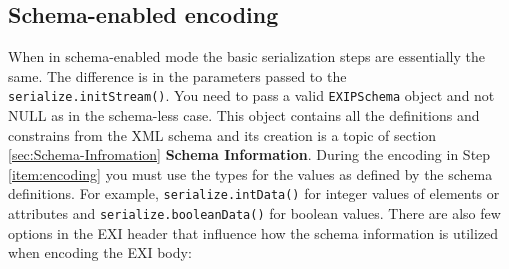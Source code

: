 \subsection{Schema-enabled encoding}
When in schema-enabled mode the basic serialization steps are essentially the same.
The difference is in the parameters passed to the \texttt{serialize.initStream()}.
You need to pass a valid \texttt{EXIPSchema} object and not NULL as in the schema-less
case. This object contains all the definitions and constrains from the XML schema and
its creation is a topic of section \ref{sec:Schema-Infromation} \textbf{Schema Information}.
During the encoding in Step \ref{item:encoding} you must use the types for the
values as defined by the schema definitions. For example, \texttt{serialize.intData()} for
integer values of elements or attributes and \texttt{serialize.booleanData()} for boolean values.
There are also few options
in the EXI header that influence how the schema information is utilized when encoding
the EXI body:
